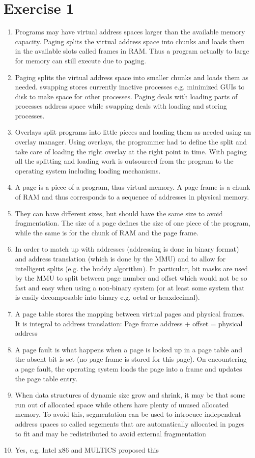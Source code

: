 \documentclass[a4paper,10pt]{article}
\begin{document}
\section*{Exercise 1}
\begin{enumerate}
 \item Programs may have virtual address spaces larger than the available memory capacity. Paging splits the virtual address space into chunks and loads them in the available slots called frames in RAM. Thus a program actually to large for memory can still execute due to paging.
 \item Paging splits the virtual address space into smaller chunks and loads them as needed. swapping stores currently inactive processes e.g. minimized GUIs to disk to make space for other processes. Paging deals with loading parts of processes address space while swapping deals with loading and storing processes.
 \item Overlays split programs into little pieces and loading them as needed using an overlay manager. Using overlays, the programmer had to define the split and take care of loading the right overlay at the right point in time. With paging all the splitting and loading work is outsourced from the program to the operating system including loading mechanisms.
 \item A page is a piece of a program, thus virtual memory. A page frame is a chunk of RAM and thus corresponds to a sequence of addresses in physical memory.
 \item They can have different sizes, but should have the same size to avoid fragmentation. The size of a page defines the size of one piece of the program, while the same is for the chunk of RAM and the page frame. 
 \item In order to match up with addresses (addressing is done in binary format) and address translation (which is done by the MMU) and to allow for intelligent splits (e.g. the buddy algorithm). In particular, bit masks are used by the MMU to split between page number and offset which would not be so fast and easy when using a non-binary system (or at least some system that is easily decomposable into binary e.g. octal or heaxdecimal).
 \item A page table stores the mapping between virtual pages and physical frames. It is integral to address translation: Page frame address + offset = physical address
 \item A page fault is what happens when a page is looked up in a page table and the absent bit is set (no page frame is stored for this page). On encountering a page fault, the operating system loads the page into a frame and updates the page table entry.
 \item When data structures of dynamic size grow and shrink, it may be that some run out of allocated space while others have plenty of unused allocated memory. To avoid this, segmentation can be used to introcuce independent address spaces so called segements that are automatically allocated in pages to fit and may be redistributed to avoid external fragmentation
 \item Yes, e.g. Intel x86 and MULTICS proposed this
\end{enumerate}
\end{document}

